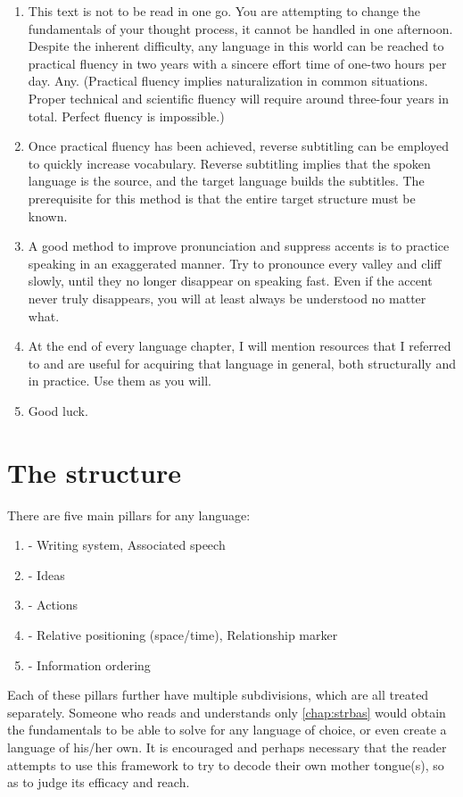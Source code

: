 \begin{enumerate}
    \item This text is not to be read in one go. You are attempting to change the fundamentals of your thought process, it cannot be handled in one afternoon. Despite the inherent difficulty, any language in this world can be reached to practical fluency in two years with a sincere effort time of one-two hours per day. Any. (Practical fluency implies naturalization in common situations.  Proper technical and scientific fluency will require around three-four years in total. Perfect fluency is impossible.)
    \item Once  practical fluency has been achieved, reverse subtitling can be employed to quickly increase vocabulary. Reverse subtitling implies that the spoken language is the source, and the target language builds the subtitles. The prerequisite for this method is that the entire target structure must be known.
    \item A good method to improve pronunciation and suppress accents is to practice speaking in an exaggerated manner. Try to pronounce every valley and cliff slowly, until they no longer disappear on speaking fast. Even if the accent never truly disappears, you will at least always be understood no matter what.
    \item At the end of every language chapter, I will mention resources that I referred to and are useful for acquiring that language in general, both structurally and in practice. Use them as you will. 
    \item Good luck.
\end{enumerate}
\chapter{The structure} \label{chap:strbas}
There are five main pillars for any language:
\begin{enumerate}
    \item {} - Writing system, Associated speech
    \item {} - Ideas
    \item {} - Actions
    \item {} - Relative positioning (space/time), Relationship marker
    \item {} - Information ordering
\end{enumerate}
Each of these pillars further have multiple subdivisions, which are all treated separately. Someone who reads and understands only \autoref{chap:strbas} would obtain the fundamentals to be able to solve  for any language  of choice, or even create a language of his/her own. It is encouraged and perhaps necessary that the reader attempts to use this framework to try to decode their own mother tongue(s), so as to judge its efficacy and reach.

